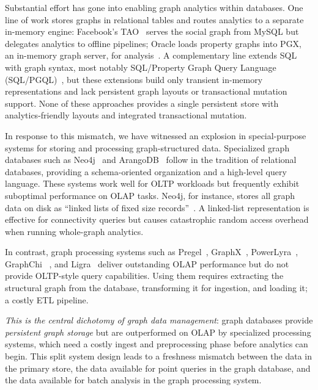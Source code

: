 Substantial effort has gone into enabling graph analytics within databases.
One line of work stores graphs in relational tables and routes analytics to a separate in-memory engine: Facebook's TAO~\cite{bronson2013tao} serves the social graph from MySQL but delegates analytics to offline pipelines; Oracle loads property graphs into PGX, an in-memory graph server, for analysis~\cite{OraclePG,WhatIsOracleSpatialGraph:online,hong2015pgx,welc2013graph,hong2013early}.
A complementary line extends SQL with graph syntax, most notably SQL/Property Graph Query Language (SQL/PGQL)~\cite{duckpgq:online}, but these extensions build only transient in-memory representations and lack persistent graph layouts or transactional mutation support.
None of these approaches provides a single persistent store with analytics-friendly layouts and integrated transactional mutation.

In response to this mismatch, we have witnessed an explosion in special-purpose systems for storing and processing graph-structured data.
Specialized graph databases such as Neo4j~\cite{neo4j} and ArangoDB~\cite{arangodb} follow in the tradition of relational databases, providing a schema-oriented organization and a high-level query language.
These systems work well for OLTP workloads but frequently exhibit suboptimal performance on OLAP tasks.
Neo4j, for instance, stores all graph data on disk as ``linked lists of fixed size records''~\cite{neo4j:data_layout:2024}.
A linked-list representation is effective for connectivity queries but causes catastrophic random access overhead when running whole-graph analytics.

In contrast, graph processing systems such as Pregel~\cite{malewicz2010pregel}, GraphX~\cite{gonzalez2014graphx}, PowerLyra~\cite{powerlyra2019}, GraphChi ~\cite{kyrola2012graphchi}, and Ligra~\cite{shun2013ligra} deliver outstanding OLAP performance but do not provide OLTP-style query capabilities.
Using them requires extracting the structural graph from the database, transforming it for ingestion, and loading it; a costly ETL pipeline.

\textit{This is the central dichotomy of graph data management}: graph databases provide \emph{persistent graph storage} but are outperformed on OLAP by specialized processing systems, which need a costly ingest and preprocessing phase before analytics can begin.
This split system design leads to a freshness mismatch between the data in the primary store, the data available for point queries in the graph database, and the data available for batch analysis in the graph processing system.

